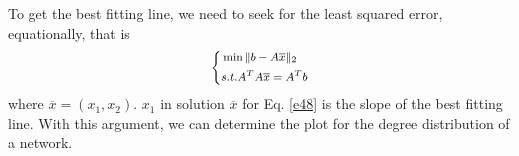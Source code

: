 \documentclass[final]{IEEEtran}
\begin{document}
To get the best fitting line, we need to seek for the least
squared error, equationally, that is
\begin{equation}\label{e48}\footnotesize
\begin{aligned}
 \left\{
   \begin{aligned}
   & \min \|b-A\overline{x}\|_{2}\\
   & s.t. A^{T}A\overline{x}=A^{T}b\\
   \end{aligned}
   \right.
\end{aligned}
\end{equation}
where $\overline{x}$$=$$(x_{1}, x_{2})$. $x_{1}$ in solution
$\overline{x}$ for Eq. \ref{e48} is the slope of the best fitting
line. With this argument, we can determine the plot for the degree
distribution of a network.
\end{document}
